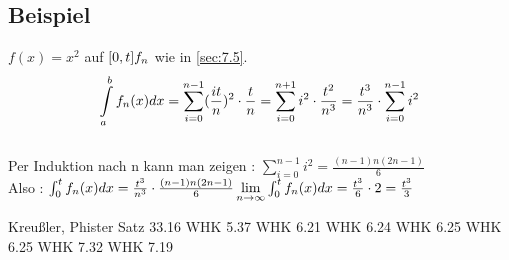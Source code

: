 \subsection{Beispiel}
$f(x) = x^2$ auf $[0,t]\\
f_n$ wie in \ref{sec:7.5}.\\
\[\int\limits_{a}^b f_n(x)dx = \sum\limits_{i=0}^{n-1}(\frac{it}{n})^2 \cdot \frac{t}{n} =\sum\limits_{i=0}^{n+1} i^2 \cdot \frac{t^2}{n^3} = \frac{t^3}{n^3}\cdot \sum\limits_{i=0}^{n-1} i^2\]\\
Per Induktion nach n kann man zeigen : $\sum\limits_{i=0}^{n-1} i^2 = \frac{(n-1)n(2n-1)}{6}$\\
Also : $\int_{0}^{t} f_n(x)dx = \frac{t^3}{n^3} \cdot \frac{(n-1)n(2n-1)}{6}\\
\lim\limits_{n \to \infty} \int_{0}^{t} f_n(x)dx = \frac{t^3}{6} \cdot 2 = \frac{t^3}{3}$
\begin{thebibliography}{9}
 Kreu\ss ler, Phister Satz 33.16
 WHK 5.37
 WHK 6.21
 WHK 6.24
 WHK 6.25
 WHK 6.25
 WHK 7.32
 WHK 7.19
\end{thebibliography}
